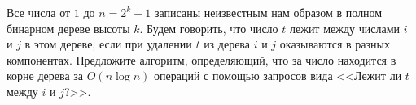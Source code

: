 \documentclass{article}
\begin{document}
Все числа от $1$ до $n=2^k - 1$ записаны неизвестным нам образом
в полном бинарном дереве высоты $k$. Будем говорить, что число $t$ лежит между числами $i$ и $j$
в этом дереве, если при удалении $t$ из дерева $i$ и $j$ оказываются в разных компонентах. Предложите алгоритм, определяющий, что за число находится в корне дерева за $O(n \log n)$ операций с помощью запросов вида <<Лежит ли $t$ между 
$i$ и $j$?>>.
\end{document}
